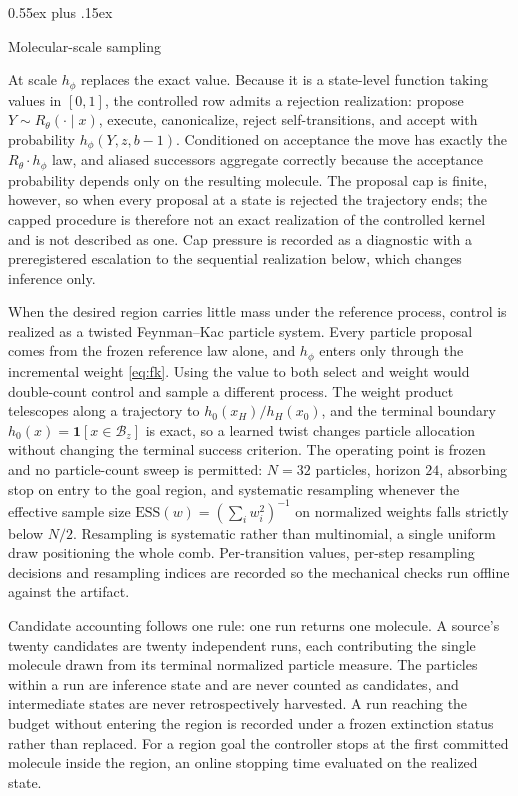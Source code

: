 \documentclass{article}
\makeatletter
\theoremstyle{definition}
\theoremstyle{remark}
\def\subsection{\@startsection{subsection}{2}{\z@}{-1.2ex plus -0.4ex minus -.2ex}%
  {0.55ex plus .15ex}{\normalsize\sc\raggedright}}
\newcommand{\Bset}{\mathcal{B}}
\newcommand{\one}{\mathbf{1}}
\makeatother
\begin{document}
\subsection{Molecular-scale sampling}

At scale $h_\phi$ replaces the exact value. Because it is a state-level function taking values in $[0,1]$, the controlled row admits a rejection realization: propose $Y\sim R_\theta(\cdot\mid x)$, execute, canonicalize, reject self-transitions, and accept with probability $h_\phi(Y,z,b-1)$. Conditioned on acceptance the move has exactly the $R_\theta\cdot h_\phi$ law, and aliased successors aggregate correctly because the acceptance probability depends only on the resulting molecule. The proposal cap is finite, however, so when every proposal at a state is rejected the trajectory ends; the capped procedure is therefore not an exact realization of the controlled kernel and is not described as one. Cap pressure is recorded as a diagnostic with a preregistered escalation to the sequential realization below, which changes inference only.

When the desired region carries little mass under the reference process, control is realized as a twisted Feynman--Kac particle system. Every particle proposal comes from the frozen reference law alone, and $h_\phi$ enters only through the incremental weight \eqref{eq:fk}. Using the value to both select and weight would double-count control and sample a different process. The weight product telescopes along a trajectory to $h_0(x_H)/h_H(x_0)$, and the terminal boundary $h_0(x)=\one[x\in\Bset_z]$ is exact, so a learned twist changes particle allocation without changing the terminal success criterion. The operating point is frozen and no particle-count sweep is permitted: $N=32$ particles, horizon $24$, absorbing stop on entry to the goal region, and systematic resampling whenever the effective sample size $\mathrm{ESS}(w)=(\sum_i w_i^2)^{-1}$ on normalized weights falls strictly below $N/2$. Resampling is systematic rather than multinomial, a single uniform draw positioning the whole comb. Per-transition values, per-step resampling decisions and resampling indices are recorded so the mechanical checks run offline against the artifact.

Candidate accounting follows one rule: one run returns one molecule. A source's twenty candidates are twenty independent runs, each contributing the single molecule drawn from its terminal normalized particle measure. The particles within a run are inference state and are never counted as candidates, and intermediate states are never retrospectively harvested. A run reaching the budget without entering the region is recorded under a frozen extinction status rather than replaced. For a region goal the controller stops at the first committed molecule inside the region, an online stopping time evaluated on the realized state.
\end{document}
